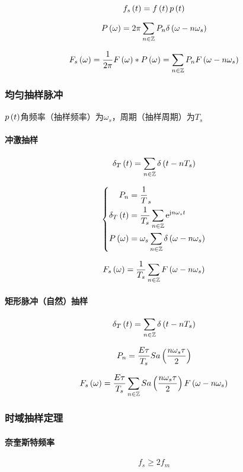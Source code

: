\documentclass{article}
\begin{document}
\[f_s\left(t\right)=f\left(t\right) p\left(t\right)\]

\[P\left(\omega\right)=2\pi\sum_{n\in\mathbb Z} P_n\delta\left(\omega-n\omega_s\right)\]

\[F_s\left(\omega\right)=\frac1{2\pi}F\left(\omega\right)\ast P\left(\omega\right)=\sum_{n\in\mathbb Z} P_nF\left(\omega-n\omega_s\right)\]

\subsubsection{均匀抽样脉冲}

$p\left(t\right)$角频率（抽样频率）为$\omega_s$，周期（抽样周期）为$T_s$

\paragraph{冲激抽样}

\[\delta_T\left(t\right)=\sum_{n\in\mathbb Z}\delta\left(t-nT_s\right)\]

\[\left\{\begin{aligned}
        P_n              & =\frac1T_s                                   \\
        \delta_T\left(t\right) & =\frac1{T_s}\sum_{n\in\mathbb Z}\mathrm e^{\mathrm j n\omega_s t}        \\
        P\left(\omega\right)   & =\omega_s\sum_{n\in\mathbb Z}\delta\left(\omega-n\omega_s\right)
    \end{aligned}\right.\]

\[F_s\left(\omega\right)=\frac1{T_s}\sum_{n\in\mathbb Z} F\left(\omega-n\omega_s\right)\]

\paragraph{矩形脉冲（自然）抽样}

\[\delta_T\left(t\right)=\sum_{n\in\mathbb Z}\delta\left(t-nT_s\right)\]

\[P_n=\frac{E\tau}{T_s}Sa\left(\frac{n\omega_s\tau}2\right)\]

\[F_s\left(\omega\right)=\frac{E\tau}{T_s}\sum_{n\in\mathbb Z} Sa\left(\frac{n\omega_s\tau}2\right)F\left(\omega-n\omega_s\right)\]

\subsubsection{时域抽样定理}

\paragraph{奈奎斯特频率}

\[f_s\geqslant2f_m\]
\end{document}
